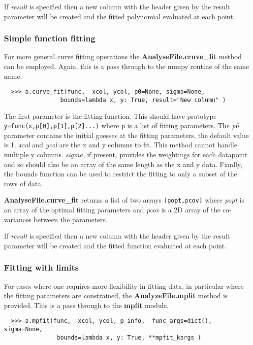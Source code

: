 \documentclass[a4paper,11pt]{scrartcl}
\begin{document}
If \textit{result} is specified then a new column with the header given by the result parameter will be created and the fitted polynomial evaluated at each point.

\subsubsection{Simple function fitting}

For more general curve fitting operations the \textbf{AnalyseFile.cruve\_fit}
method can be employed. Again, this is a pass through to the numpy routine of
the same name.

\begin{verbatim}
  >>> a.curve_fit(func,  xcol, ycol, p0=None, sigma=None,
                bounds=lambda x, y: True, result="New column" )
\end{verbatim}

The first parameter is the fitting function. This should have prototype
\\\verb:y=func(x,p[0],p[1],p[2]...): where p is a list of fitting parameters.
The \textit{p0} parameter contains the initial guesses at the fitting
parameters, the default value is 1. \textit{xcol} and \textit{ycol} are the x
and y columns to fit. This method cannot handle multiple y columns.
\textit{sigma}, if present, provides the weightings for each datapoint and so
should also be an array of the same length as the x and y data. Fianlly, the
bounds function can be used to restrict the fitting to only a subset of the rows
of data.

\textbf{AnalyseFile.curve\_fit} returns a list of two arrays \verb:[popt,pcov]:
where \textit{popt} is an array of the optimal fitting parameters and
\textit{pcov} is a 2D array of the co-variances between the parameters.

If \textit{result} is specified then a new column with the header given by the result parameter will be created and the fitted function evaluated at each point.


\subsubsection{Fitting with limits}

For cases where one requires more flexibility in fitting data, in particular
where the fitting parameters are constrained, the \textbf{AnalyzeFile.mpfit}
method is provided. This is a pass through to the \textbf{mpfit} module.

\begin{verbatim}
  >>> a.mpfit(func,  xcol, ycol, p_info,  func_args=dict(), sigma=None,
               bounds=lambda x, y: True, **mpfit_kargs )
\end{verbatim}
\end{document}
